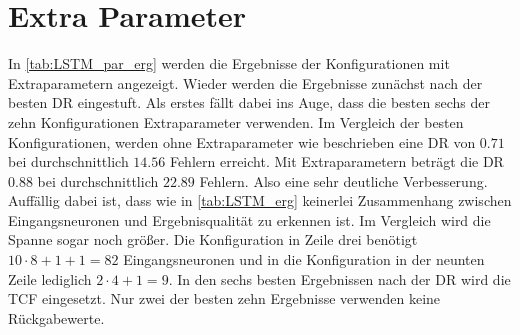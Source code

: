 \section{Extra Parameter}\label{sec:erg_LSTM_extra}
    In \autoref{tab:LSTM_par_erg} werden die Ergebnisse der Konfigurationen mit Extraparametern angezeigt. 
    Wieder werden die Ergebnisse zunächst nach der besten \ac{DR} eingestuft.
    Als erstes fällt dabei ins Auge, dass die besten sechs der zehn Konfigurationen Extraparameter verwenden.
    Im Vergleich der besten Konfigurationen, werden ohne Extraparameter wie beschrieben eine \ac{DR} von $0.71$ bei durchschnittlich $14.56$ Fehlern erreicht.
    Mit Extraparametern beträgt die \ac{DR} $0.88$ bei durchschnittlich $22.89$ Fehlern.
    Also eine sehr deutliche Verbesserung.
    Auffällig dabei ist, dass wie in \autoref{tab:LSTM_erg} keinerlei Zusammenhang zwischen Eingangsneuronen und Ergebnisqualität zu erkennen ist.
    Im Vergleich wird die Spanne sogar noch größer.
    Die Konfiguration in Zeile drei benötigt $10\cdot8 + 1 + 1=82$ Eingangsneuronen und in die Konfiguration in der neunten Zeile  lediglich $2\cdot4 + 1 = 9$.
    In den sechs besten Ergebnissen nach der \ac{DR} wird die \ac{TCF} eingesetzt.
    Nur zwei der besten zehn Ergebnisse verwenden keine Rückgabewerte.
